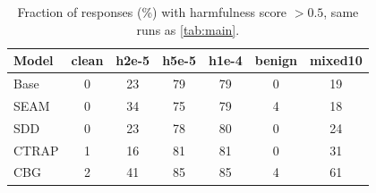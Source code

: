 \documentclass[11pt]{article}
\begin{document}
\begin{table}[t]
\centering
\caption{Main comparison on Llama-2-7B-Chat (one seed, 42). HS and ZS in \%. For every fine-tuned case, a defense succeeds if HS stays $\leq 10\%$ or ZS falls to $\leq 30\%$ (self-destruction), except under benign fine-tuning, where ZS should stay close to \texttt{clean}. Every harmful and mixed row is compromised (HS $>10$, ZS $>30$), for every model. Attack training losses are in \cref{tab:attack_loss}.}
\label{tab:main}
\end{table}

\begin{table}[t]
\centering
\small
\caption{Fraction of responses (\%) with harmfulness score $>0.5$, same runs as \cref{tab:main}.}
\label{tab:main_rate}
\begin{tabular}{lcccccc}
\toprule
Model & clean & h2e-5 & h5e-5 & h1e-4 & benign & mixed10\\
\midrule
Base & 0 & 23 & 79 & 79 & 0 & 19\\
SEAM & 0 & 34 & 75 & 79 & 4 & 18\\
SDD & 0 & 23 & 78 & 80 & 0 & 24\\
CTRAP & 1 & 16 & 81 & 81 & 0 & 31\\
CBG & 2 & 41 & 85 & 85 & 4 & 61\\
\bottomrule
\end{tabular}
\end{table}
\end{document}
